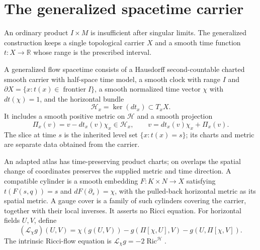 \section{The generalized spacetime carrier}

An ordinary product $I\times M$ is insufficient after singular limits.  The
generalized construction keeps a single topological carrier $X$ and a smooth
time function $t:X\to\mathbb R$ whose range is the prescribed interval.

\begin{definition}
\label{def:generalized-spacetime}
A generalized flow spacetime consists of a Hausdorff second-countable
charted smooth carrier with half-space time model, a smooth clock with
range $I$ and $\partial X=\{x:t(x)\in\operatorname{frontier}I\}$,
a smooth normalized time vector $\chi$
with $dt(\chi)=1$, and the horizontal bundle
\[
 \mathcal H_x=\ker(dt_x)\subset T_xX.
\]
It includes a smooth positive metric on $\mathcal H$ and a smooth projection
\[
 \Pi_x(v)=v-dt_x(v)\chi_x\in\mathcal H_x,
 \qquad v=dt_x(v)\chi_x+\Pi_x(v).
\]
The slice at time $s$ is the inherited level set $\{x:t(x)=s\}$; its charts
and metric are separate data obtained from the carrier.
\end{definition}

An adapted atlas has time-preserving product charts; on overlaps the spatial
change of coordinates preserves the supplied metric and time direction.
A compatible cylinder is a smooth embedding $F:K\times N\to X$ satisfying
$t(F(s,q))=s$ and $dF(\partial_s)=\chi$, with the pulled-back horizontal
metric as its spatial metric.  A gauge cover is a family of such cylinders
covering the carrier, together with their local inverses.  It asserts no
Ricci equation.  For horizontal fields $U,V$, define
\[
 (\mathcal L_\chi g)(U,V)
 =\chi(g(U,V))-g(\Pi[\chi,U],V)-g(U,\Pi[\chi,V]).
\]
The intrinsic Ricci-flow equation is
$\mathcal L_\chi g=-2\operatorname{Ric}^{\mathcal H}$.

